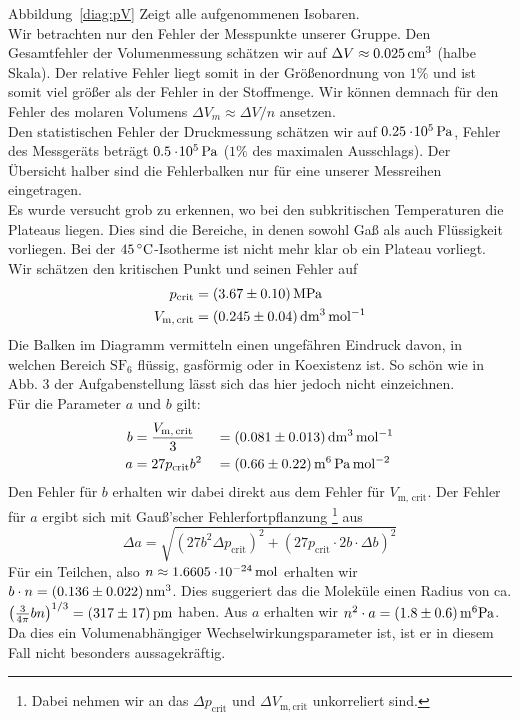 %
Abbildung~\ref{diag:pV} Zeigt alle aufgenommenen Isobaren. \\
%
Wir betrachten nur den Fehler der Messpunkte unserer Gruppe.
Den Gesamtfehler der Volumenmessung schätzen wir auf $\Delta V \approx \unit[0.025]{cm^3}$ (halbe Skala). Der relative Fehler liegt somit in der Größenordnung von $1\%$ und ist somit viel größer als der Fehler in der Stoffmenge. Wir können demnach für den Fehler des molaren Volumens $\Delta V_m \approx \Delta V / n$ ansetzen.\\
%
Den statistischen Fehler der Druckmessung schätzen wir auf $\unit[0.25 \e{5}]{Pa}$, Fehler des Messgeräts beträgt $\unit[0.5 \e5]{Pa}$ ($1\%$ des maximalen Ausschlags). 
Der Übersicht halber sind die Fehlerbalken nur für eine unserer Messreihen eingetragen.\\
%
Es wurde versucht grob zu erkennen, wo bei den subkritischen Temperaturen die Plateaus liegen. Dies sind die Bereiche, in denen sowohl Gaß als auch Flüssigkeit vorliegen. Bei der $\unit[45]{ ^\circ C}$-Isotherme ist nicht mehr klar ob ein Plateau vorliegt. Wir schätzen den kritischen Punkt und seinen Fehler auf
\begin{align*}
    p_\mathrm{crit} &= \unit[(3.67 \pm 0.10)]{MPa} \\
    V_\mathrm{m,\, crit} &= \unit[(0.245 \pm 0.04)]{dm^3\, mol^{-1}}
\end{align*}
%
Die Balken im Diagramm vermitteln einen ungefähren Eindruck davon, in welchen Bereich $\mathrm{S F_6}$ flüssig, gasförmig oder in Koexistenz ist. So schön wie in Abb. 3 der Aufgabenstellung lässt sich das hier jedoch nicht einzeichnen.\\
%
Für die Parameter $a$ und $b$ gilt:
%
\begin{alignat*}{3}
    b &= \frac{V_\mathrm{m,\, crit}}{3} &&= \unit[(0.081 \pm  0.013)]{dm^3\, mol^{-1}}\\
    a &= 27 p_\mathrm{crit} b^2 &&= \unit[(0.66 \pm 0.22)]{m^6\, Pa\, mol^{-2}}
\end{alignat*}
%
Den Fehler für $b$ erhalten wir dabei direkt aus dem Fehler für $V_\mathrm{m,\, crit}$. Der Fehler für $a$ ergibt sich mit Gauß'scher Fehlerfortpflanzung%
\footnote{Dabei nehmen wir an das $\Delta p_\mathrm{crit}$ und $\Delta V_\mathrm{m, crit}$ unkorreliert sind.}
aus
\[
    \Delta a = \sqrt{(27 b^2  \Delta p_\mathrm{crit})^2 +
                     (27 p_\mathrm{crit} \cdot 2 b \cdot \Delta b)^2}
\]
%
Für ein Teilchen, also $n \approx \unit[1.6605\e{-24}]{mol}$ erhalten wir $b \cdot n = \unit[(0.136 \pm 0.022)]{nm^3}$. Dies suggeriert das die Moleküle einen Radius von ca. $\left( \frac{3}{4\pi} b n \right)^{1/3} = \unit[(317 \pm 17)]{pm}$ haben. Aus $a$ erhalten wir $n^2 \cdot a = \unit[(1.8 \pm 0.6)]{m^6 Pa}$. Da dies ein Volumenabhängiger Wechselwirkungsparameter ist, ist er in diesem Fall nicht besonders aussagekräftig.


